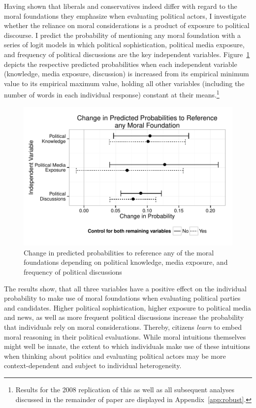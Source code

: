 \documentclass[12pt]{article}
\begin{document}
Having shown that liberals and conservatives indeed differ with regard to the moral foundations they emphasize when evaluating political actors, I investigate whether the reliance on moral considerations is a product of exposure to political discourse. I predict the probability of mentioning any moral foundation with a series of logit models in which political sophistication, political media exposure, and frequency of political discussions are the key independent variables. Figure~\ref{fig:3learn} depicts the respective predicted probabilities when each independent variable (knowledge, media exposure, discussion) is increased from its empirical minimum value to its empirical maximum value, holding all other variables (including the number of words in each individual response) constant at their means.\footnote{Results for the 2008 replication of this as well as all subsequent analyses discussed in the remainder of paper are displayed in Appendix~\ref{app:robust}.}

\begin{figure}[h]\centering
\includegraphics[scale=.9]{../calc/fig/fig3learn.pdf}
\caption{Change in predicted probabilities to reference any of the moral foundations depending on political knowledge, media exposure, and frequency of political discussions}\label{fig:3learn}
\end{figure}

The results show, that all three variables have a positive effect on the individual probability to make use of moral foundations when evaluating political parties and candidates. Higher political sophistication, higher exposure to political media and news, as well as more frequent political discussions increase the probability that individuals rely on moral considerations. Thereby, citizens \textit{learn} to embed moral reasoning in their political evaluations. While moral intuitions themselves might well be innate, the extent to which individuals make use of these intuitions when thinking about politics and evaluating political actors may be more context-dependent and subject to individual heterogeneity.
\end{document}
